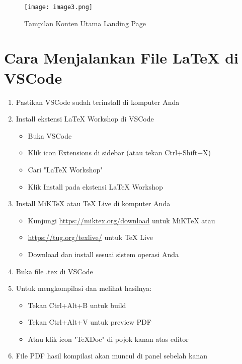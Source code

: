 \documentclass[a4paper,12pt]{article}
\begin{document}
\begin{figure}[h]
    \centering
    \texttt{[image: image3.png]}
    \caption{Tampilan Konten Utama Landing Page}
    \label{fig:konten-utama}
\end{figure}

\section{Cara Menjalankan File LaTeX di VSCode}
\begin{enumerate}[label=\arabic*.]
    \item Pastikan VSCode sudah terinstall di komputer Anda
    \item Install ekstensi LaTeX Workshop di VSCode
    \begin{itemize}
        \item Buka VSCode
        \item Klik icon Extensions di sidebar (atau tekan Ctrl+Shift+X)
        \item Cari "LaTeX Workshop"
        \item Klik Install pada ekstensi LaTeX Workshop
    \end{itemize}
    \item Install MiKTeX atau TeX Live di komputer Anda
    \begin{itemize}
        \item Kunjungi \url{https://miktex.org/download} untuk MiKTeX atau
        \item \url{https://tug.org/texlive/} untuk TeX Live
        \item Download dan install sesuai sistem operasi Anda
    \end{itemize}
    \item Buka file .tex di VSCode
    \item Untuk mengkompilasi dan melihat hasilnya:
    \begin{itemize}
        \item Tekan Ctrl+Alt+B untuk build
        \item Tekan Ctrl+Alt+V untuk preview PDF
        \item Atau klik icon "TeXDoc" di pojok kanan atas editor
    \end{itemize}
    \item File PDF hasil kompilasi akan muncul di panel sebelah kanan
\end{enumerate}
\end{document}
